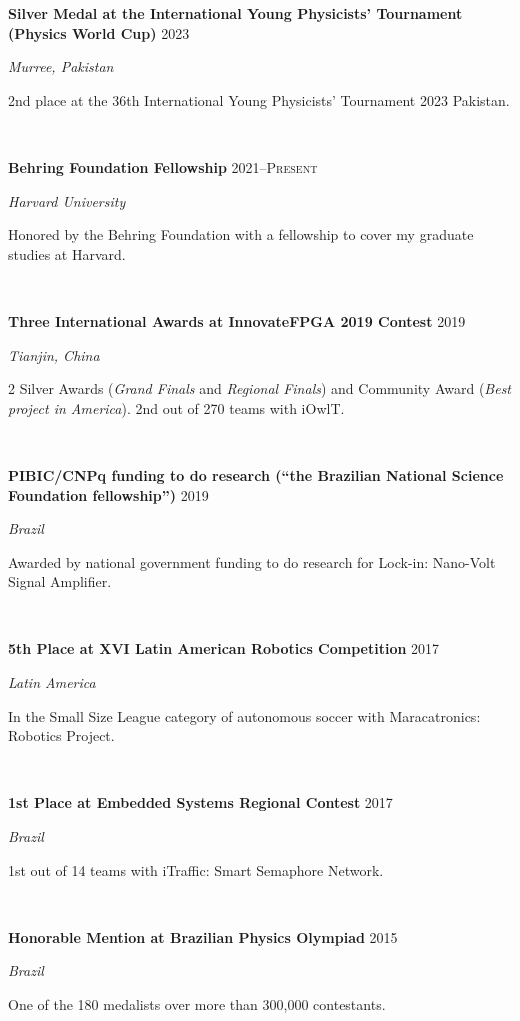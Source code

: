 \documentclass[letterpaper,10pt]{article}
\newcommand{\entry}[4]{

\begin{minipage}[t]{.15\textwidth}
\end{minipage}
\hfill\vline\hfill 
\begin{minipage}[t]{0.95\textwidth}
#2 \hfill \textsc{#1}

\textit{#3}

\footnotesize{#4}
\end{minipage}\\\vspace{.25cm}}
\newcommand{\mycomment}[1]{}
\begin{document}
\entry{2023}{\textbf{Silver Medal at the International Young Physicists' Tournament (Physics World Cup)}}{Murree, Pakistan}{
	2nd place at the 36th International Young Physicists' Tournament 2023 Pakistan.	
}

\entry{2021--Present}{\textbf{Behring Foundation Fellowship}}{Harvard University}{
	Honored by the Behring Foundation with a fellowship to cover my graduate studies at Harvard.	
}

\entry{2019}{\textbf{Three International Awards at InnovateFPGA 2019 Contest}}{Tianjin, China}{
	2 Silver Awards (\textit{Grand Finals} and \textit{Regional Finals}) and Community Award (\textit{Best project in America}). 2nd out of 270 teams with iOwlT.
}

\entry{2019}{\textbf{PIBIC/CNPq funding to do research (``the Brazilian National Science Foundation fellowship'')}}{Brazil}{
	Awarded by national government funding to do research for Lock-in: Nano-Volt Signal Amplifier.	
}

\entry{2017}{\textbf{5th Place at XVI Latin American Robotics Competition}}{Latin America}{
	In the Small Size League category of autonomous soccer with Maracatronics: Robotics Project.
}

\entry{2017}{\textbf{1st Place at Embedded Systems Regional Contest}}{Brazil}{
	1st out of 14 teams with iTraffic: Smart Semaphore Network.
}

\entry{2015}{\textbf{Honorable Mention at Brazilian Physics Olympiad}}{Brazil}{
	One of the 180 medalists over more than 300,000 contestants.
}
\vspace*{-.25cm}

\end{document}
